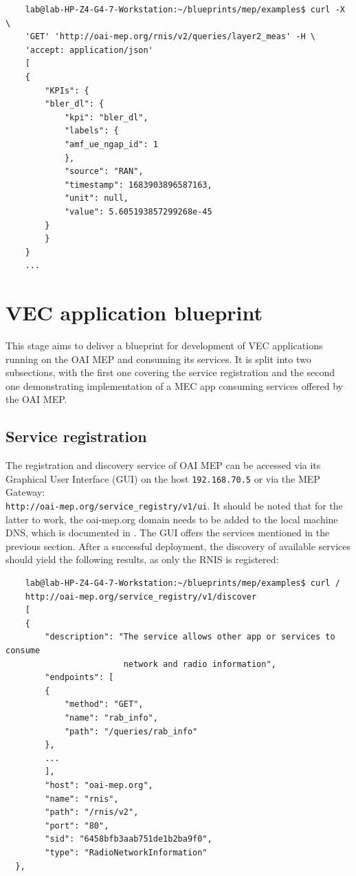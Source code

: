 \documentclass[12pt,a4paper,twoside]{report}
\begin{document}
\begin{verbatim}
	lab@lab-HP-Z4-G4-7-Workstation:~/blueprints/mep/examples$ curl -X \
	'GET' 'http://oai-mep.org/rnis/v2/queries/layer2_meas' -H \
	'accept: application/json'
	[
	{
		"KPIs": {
		"bler_dl": {
			"kpi": "bler_dl",
			"labels": {
			"amf_ue_ngap_id": 1
			},
			"source": "RAN",
			"timestamp": 1683903896587163,
			"unit": null,
			"value": 5.605193857299268e-45
		}
		}
	}
	...
\end{verbatim}

\section{VEC application blueprint}
This stage aims to deliver a blueprint for development of VEC applications running on the OAI MEP and consuming its services. It is split into two subsections, with the first one covering the service registration and the second one demonstrating implementation of a MEC app consuming services offered by the OAI MEP.
%
\subsection{Service registration}
The registration and discovery service of OAI MEP can be accessed via its Graphical User Interface (GUI) on the host \verb |192.168.70.5| or via the MEP Gateway:\\\verb |http://oai-mep.org/service_registry/v1/ui|. It should be noted that for the latter to work, the oai-mep.org domain needs to be added to the local machine DNS, which is documented in \cite{oai-blueprint-git}. The GUI offers the services mentioned in the previous section. After a successful deployment, the discovery of available services should yield the following results, as only the RNIS is registered:
%

\begin{verbatim}
	lab@lab-HP-Z4-G4-7-Workstation:~/blueprints/mep/examples$ curl /
	http://oai-mep.org/service_registry/v1/discover 
	[
	{
		"description": "The service allows other app or services to consume
						network and radio information",
		"endpoints": [
		{
			"method": "GET",
			"name": "rab_info",
			"path": "/queries/rab_info"
		},
		...
		],
		"host": "oai-mep.org",
		"name": "rnis",
		"path": "/rnis/v2",
		"port": "80",
		"sid": "6458bfb3aab751de1b2ba9f0",
		"type": "RadioNetworkInformation"
  },
\end{verbatim}
\end{document}
